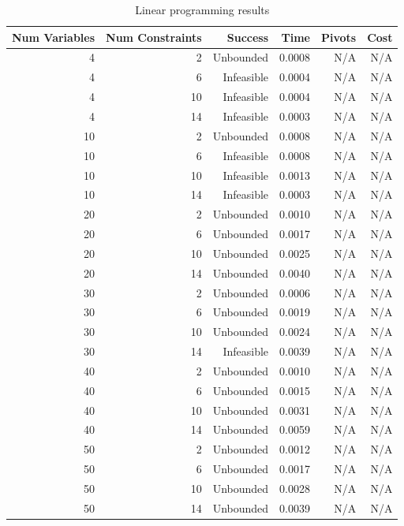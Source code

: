 \begin{table}[ht]
    \centering
    \begin{tabular}{rrrrrr}
        \toprule
        Num Variables & Num Constraints & Success & Time & Pivots & Cost \\
        \midrule
        4 & 2 & Unbounded & 0.0008 & N/A & N/A \\
		4 & 6 & Infeasible & 0.0004 & N/A & N/A \\
		4 & 10 & Infeasible & 0.0004 & N/A & N/A \\
		4 & 14 & Infeasible & 0.0003 & N/A & N/A \\
		10 & 2 & Unbounded & 0.0008 & N/A & N/A \\
		10 & 6 & Infeasible & 0.0008 & N/A & N/A \\
		10 & 10 & Infeasible & 0.0013 & N/A & N/A \\
		10 & 14 & Infeasible & 0.0003 & N/A & N/A \\
		20 & 2 & Unbounded & 0.0010 & N/A & N/A \\
		20 & 6 & Unbounded & 0.0017 & N/A & N/A \\
		20 & 10 & Unbounded & 0.0025 & N/A & N/A \\
		20 & 14 & Unbounded & 0.0040 & N/A & N/A \\
		30 & 2 & Unbounded & 0.0006 & N/A & N/A \\
		30 & 6 & Unbounded & 0.0019 & N/A & N/A \\
		30 & 10 & Unbounded & 0.0024 & N/A & N/A \\
		30 & 14 & Infeasible & 0.0039 & N/A & N/A \\
		40 & 2 & Unbounded & 0.0010 & N/A & N/A \\
		40 & 6 & Unbounded & 0.0015 & N/A & N/A \\
		40 & 10 & Unbounded & 0.0031 & N/A & N/A \\
		40 & 14 & Unbounded & 0.0059 & N/A & N/A \\
		50 & 2 & Unbounded & 0.0012 & N/A & N/A \\
		50 & 6 & Unbounded & 0.0017 & N/A & N/A \\
		50 & 10 & Unbounded & 0.0028 & N/A & N/A \\
		50 & 14 & Unbounded & 0.0039 & N/A & N/A \\
        \bottomrule
    \end{tabular}
    \caption{Linear programming results}
    \label{tab:lp-results}
\end{table}